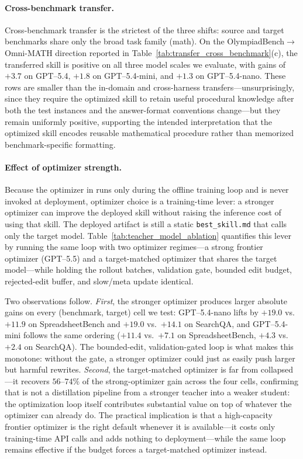 \paragraph{Cross-benchmark transfer.}
Cross-benchmark transfer is the strictest of the three shifts: source and target benchmarks share only the broad task family (math). On the OlympiadBench$\to$Omni-MATH direction reported in Table~\ref{tab:transfer_cross_benchmark}(c), the transferred skill is positive on all three model scales we evaluate, with gains of $+3.7$ on GPT--5.4, $+1.8$ on GPT--5.4-mini, and $+1.3$ on GPT--5.4-nano. These rows are smaller than the in-domain and cross-harness transfers---unsurprisingly, since they require the optimized skill to retain useful procedural knowledge after both the test instances and the answer-format conventions change---but they remain uniformly positive, supporting the intended interpretation that the optimized skill encodes reusable mathematical procedure rather than memorized benchmark-specific formatting.

\paragraph{Effect of optimizer strength.}
Because the optimizer in \ourmethod{} runs only during the offline training loop and is never invoked at deployment, optimizer choice is a training-time lever: a stronger optimizer can improve the deployed skill without raising the inference cost of using that skill. The deployed artifact is still a static \texttt{best\_skill.md} that calls only the target model. Table~\ref{tab:teacher_model_ablation} quantifies this lever by running the same loop with two optimizer regimes---a strong frontier optimizer (GPT--5.5) and a target-matched optimizer that shares the target model---while holding the rollout batches, validation gate, bounded edit budget, rejected-edit buffer, and slow/meta update identical.

Two observations follow. \emph{First}, the stronger optimizer produces larger absolute gains on every (benchmark, target) cell we test: GPT--5.4-nano lifts by $+19.0$ vs.\ $+11.9$ on SpreadsheetBench and $+19.0$ vs.\ $+14.1$ on SearchQA, and GPT--5.4-mini follows the same ordering ($+11.4$ vs.\ $+7.1$ on SpreadsheetBench, $+4.3$ vs.\ $+2.4$ on SearchQA). The bounded-edit, validation-gated loop is what makes this monotone: without the gate, a stronger optimizer could just as easily push larger but harmful rewrites. \emph{Second}, the target-matched optimizer is far from collapsed---it recovers $56$--$74\%$ of the strong-optimizer gain across the four cells, confirming that \ourmethod{} is not a distillation pipeline from a stronger teacher into a weaker student: the optimization loop itself contributes substantial value on top of whatever the optimizer can already do. The practical implication is that a high-capacity frontier optimizer is the right default whenever it is available---it costs only training-time API calls and adds nothing to deployment---while the same loop remains effective if the budget forces a target-matched optimizer instead.

